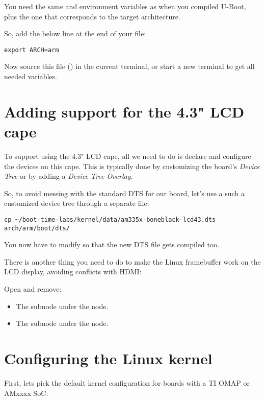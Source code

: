 You need the same  and  environment
variables as when you compiled U-Boot, plus the  one that
corresponds to the target architecture.

So, add the below line at the end of your  file:

\begin{verbatim}
export ARCH=arm
\end{verbatim}

Now source this file ()  in the current terminal,
or start a new terminal to get all needed variables.

\section{Adding support for the 4.3" LCD cape}

To support using the 4.3" LCD cape, all we need to do is declare and
configure the devices on this cape. This is typically done by
customizing the board's {\em Device Tree} or by adding a {\em Device
Tree Overlay}.

So, to avoid messing with the standard DTS for our board, let's use a
such a customized device tree through a separate file:

\begin{verbatim}
cp ~/boot-time-labs/kernel/data/am335x-boneblack-lcd43.dts arch/arm/boot/dts/
\end{verbatim}

You now have to modify  so that
the new DTS file gets compiled too.

There is another thing you need to do to make the Linux framebuffer work
on the LCD display, avoiding conflicts with HDMI:

Open  and remove:
\begin{itemize}
\item The  subnode under the  node.
\item The  subnode under the  node.
\end{itemize}

\section{Configuring the Linux kernel}

First, lets pick the default kernel configuration for boards with a TI
OMAP or AMxxxx SoC:

